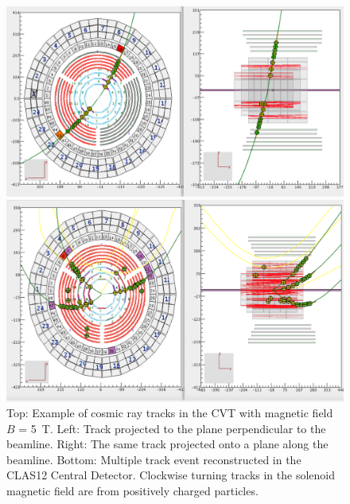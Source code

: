 \documentclass[final,3p,twocolumn]{elsarticle}
\begin{document}
\begin{figure}[htbp!]
\centerline{\includegraphics[width=1.0\columnwidth]{cvt-cosmic-w-solenoid.png}}
\centerline{\includegraphics[width=1.0\columnwidth]{cvt-3-tracks.png}}
\caption{Top: Example of cosmic ray tracks in the CVT with magnetic field $B$ = 5~T. Left: Track projected to
the plane perpendicular to the beamline. Right: The same track projected onto a plane along the beamline. Bottom:
Multiple track event reconstructed in the CLAS12 Central Detector. Clockwise turning tracks in the solenoid
magnetic field are from positively charged particles.}
\label{cvt-tracks}
\end{figure}
\end{document}
